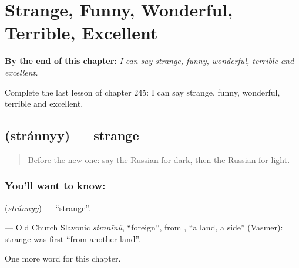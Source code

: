 
\chapter{Strange, Funny, Wonderful, Terrible, Excellent}
\label{ch:ru-strange-funny-wonderful-terrible-excellent}

\begin{chapteropening}
\textbf{By the end of this chapter:} \emph{I can say strange, funny, wonderful, terrible and excellent.}

Complete the last lesson of chapter 245: I can say strange, funny, wonderful, terrible and excellent.
\end{chapteropening}

\section[\texorpdfstring{\ru{странный} (stránnyy)}{странный (stránnyy)}]{ (stránnyy) — strange}

\label{lesson:RU-C245-strannyy}



\begin{quote}
Before the new one: say the Russian for dark, then the Russian for light.
\end{quote}

\subsection*{You'll want to know: }
\textbf{} (\emph{stránnyy}) — \textquotedblleft{}strange\textquotedblright{}.

\begin{cousinweb}
\textbf{} — Old Church Slavonic \emph{stranĭnŭ}, \textquotedblleft{}foreign\textquotedblright{}, from \emph{}, \textquotedblleft{}a land, a side\textquotedblright{} (Vasmer): strange was first \textquotedblleft{}from another land\textquotedblright{}.
\end{cousinweb}

\begin{grammarlens}[title={What you've built}]
One more word for this chapter.
\end{grammarlens}


